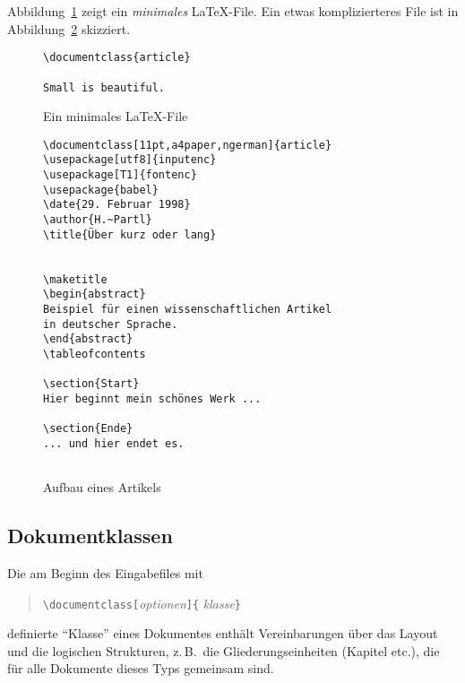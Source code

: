 Abbildung~\ref{mini} zeigt ein \emph{minimales} \LaTeX-File.
Ein etwas komplizierteres File ist in Abbildung~\ref{dokument}
skizziert.
 
\begin{figure}[hbp] %
\oben{6cm}
\begin{verbatim}
\documentclass{article}

Small is beautiful.

\end{verbatim}
\unten
\caption{Ein minimales \LaTeX-File} \label{mini}
\end{figure}

\begin{figure}[hbtp] %
\oben{10cm}
\begin{verbatim}
\documentclass[11pt,a4paper,ngerman]{article}
\usepackage[utf8]{inputenc}
\usepackage[T1]{fontenc}
\usepackage{babel}
\date{29. Februar 1998}
\author{H.~Partl}
\title{Über kurz oder lang}


\maketitle
\begin{abstract}
Beispiel für einen wissenschaftlichen Artikel
in deutscher Sprache.
\end{abstract}
\tableofcontents

\section{Start}
Hier beginnt mein schönes Werk ...

\section{Ende}
... und hier endet es.


\end{verbatim}
\unten
\caption{Aufbau eines Artikels} \label{dokument}
\end{figure}
 
 
\subsection{Dokumentklassen}\label{docsty}
 
Die am Beginn des Eingabefiles  mit
\begin{verse}
\verb|\documentclass[|\textit{optionen}\verb|]{|%
  \textit{klasse}\verb|}|
\end{verse}
definierte "`Klasse"' eines Dokumentes enthält 
Vereinbarungen über 
das Layout und die logischen Strukturen, z.\,B.\ die 
Gliederungseinheiten (Kapitel etc.\@), 
die für alle Dokumente dieses Typs gemeinsam sind.

